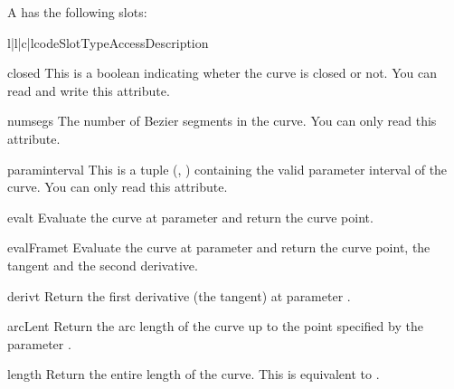 A  has the following slots:

\begin{tableiv}{l|l|c|l}{code}{Slot}{Type}{Access}{Description}
\end{tableiv}

\begin{memberdesc}{closed}
This is a boolean indicating wheter the curve is closed or not. You
can read and write this attribute.
\end{memberdesc}

\begin{memberdesc}{numsegs}
The number of Bezier segments in the curve. You can only read this
attribute.
\end{memberdesc}

\begin{memberdesc}{paraminterval}
This is a tuple (, ) containing the valid parameter
interval of the curve. You can only read this attribute.
\end{memberdesc}

\begin{methoddesc}{eval}{t}
Evaluate the curve at parameter  and return the curve point.
\end{methoddesc}

\begin{methoddesc}{evalFrame}{t}
Evaluate the curve at parameter  and return the curve point,
the tangent and the second derivative.
\end{methoddesc}

\begin{methoddesc}{deriv}{t}
Return the first derivative (the tangent) at parameter .
\end{methoddesc}

\begin{methoddesc}{arcLen}{t}
Return the arc length of the curve up to the point specified by the parameter
.
\end{methoddesc}

\begin{methoddesc}{length}{}
Return the entire length of the curve. This is equivalent to 
.
\end{methoddesc}






